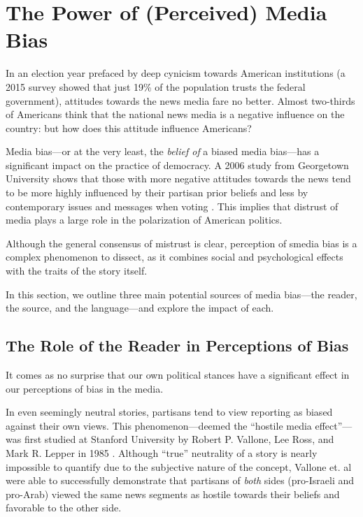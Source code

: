 \chapter{The Power of (Perceived) Media Bias}

In an election year prefaced by deep cynicism towards American institutions (a 2015 survey showed that just 19\% of the population trusts the federal government), attitudes towards the news media fare no better. Almost two-thirds of Americans think that the national news media is a negative influence on the country: but how does this attitude influence Americans? \cite{beyond-distrust}

Media bias---or at the very least, the \emph{belief of} a biased media bias---has a significant impact on the practice of democracy. A 2006 study from Georgetown University shows that those with more negative attitudes towards the news tend to be more highly influenced by their partisan prior beliefs and less by contemporary issues and messages when voting \cite{ladd2005attitudes}. This implies that distrust of media plays a large role in the polarization of American politics.
 
Although the general consensus of mistrust is clear, perception of smedia bias is a complex phenomenon to dissect, as it combines social and psychological effects with the traits of the story itself.

In this section, we outline three main potential sources of media bias---the reader, the source, and the language---and explore the impact of each.


\section{The Role of the Reader in Perceptions of Bias}

It comes as no surprise that our own political stances have a significant effect in our perceptions of bias in the media. 

In even seemingly neutral stories, partisans tend to view reporting as biased against their own views. This phenomenon---deemed the ``hostile media effect''---was first studied at Stanford University by Robert P. Vallone, Lee Ross, and Mark R. Lepper in 1985 \cite{vallone1985hostile}. Although ``true'' neutrality of a story is nearly impossible to quantify due to the subjective nature of the concept, Vallone et. al were able to successfully demonstrate that partisans of \emph{both} sides (pro-Israeli and pro-Arab) viewed the same news segments as hostile towards their beliefs and favorable to the other side.

